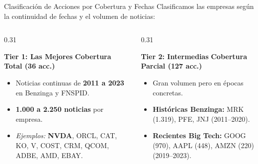 \documentclass[aspectratio=169,11pt]{beamer}
\begin{document}
\begin{frame}{Clasificación de Acciones por Cobertura y Fechas}
    Clasificamos las empresas según la continuidad de fechas y el volumen de noticias:
    \vspace{0.25cm}
    
    \begin{columns}[T]
        \begin{column}{0.31\textwidth}
            \begin{block}{\textbf{\color{GreenTier} Tier 1: Las Mejores}}
                \textbf{Cobertura Total (36 acc.)}
                \begin{itemize}
                    \item Noticias continuas de \textbf{2011 a 2023} en Benzinga y FNSPID.
                    \item \textbf{1.000 a 2.250 noticias} por empresa.
                    \item \textit{Ejemplos:} \textbf{NVDA}, ORCL, CAT, KO, V, COST, CRM, QCOM, ADBE, AMD, EBAY.
                \end{itemize}
            \end{block}
        \end{column}
        
        \begin{column}{0.31\textwidth}
            \begin{block}{\textbf{\color{OrangeTier} Tier 2: Intermedias}}
                \textbf{Cobertura Parcial (127 acc.)}
                \begin{itemize}
                    \item Gran volumen pero en épocas concretas.
                    \item \textbf{Históricas Benzinga:} MRK (1.319), PFE, JNJ (2011--2020).
                    \item \textbf{Recientes Big Tech:} GOOG (970), AAPL (448), AMZN (220) (2019--2023).
                \end{itemize}
            \end{block}
        \end{column}
        

\end{columns}
\end{frame}
\end{document}
